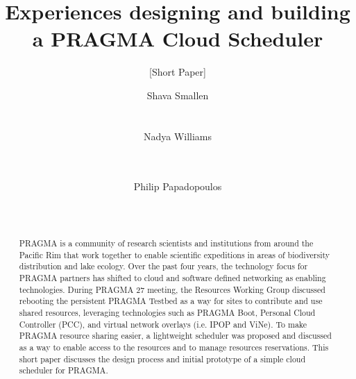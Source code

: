 \documentclass{acm_proc_article-sp}
\begin{document}
\title{Experiences designing and building a PRAGMA Cloud Scheduler}
\subtitle{[Short Paper]}


\author{
\alignauthor
Shava Smallen\\
      \\
      \\
\alignauthor
Nadya Williams\\
      \\
      \\
\and %
\alignauthor Philip Papadopoulos \\
      \\
      \\
}

\maketitle
\begin{abstract}
PRAGMA is a community of research scientists and institutions from around the Pacific Rim that work together to enable scientific expeditions in areas of biodiversity distribution and lake ecology.  Over the past four years, the technology focus for PRAGMA partners has shifted to cloud and software defined networking as enabling technologies.  During PRAGMA 27 meeting, the Resources Working Group discussed rebooting the persistent PRAGMA Testbed as a way for sites to contribute and use shared resources, leveraging technologies such as PRAGMA Boot, Personal Cloud Controller (PCC), and virtual network overlays (i.e. IPOP and ViNe).  To make PRAGMA resource sharing easier, a lightweight scheduler was proposed and discussed as a way to enable access to the resources and to manage resources reservations.  This short paper discusses the design process and initial prototype of a simple cloud scheduler for PRAGMA.  

\end{abstract}

\end{document}

